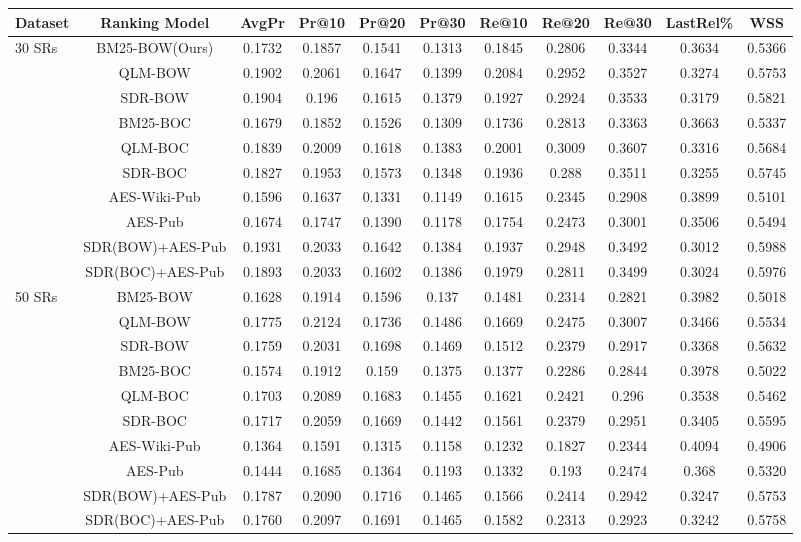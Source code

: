 \begin{tabular}{l|c|c|c|c|c|c|c|c|c|c}
		\toprule
		Dataset&Ranking Model&AvgPr&Pr@10&Pr@20&Pr@30&Re@10&Re@20&Re@30&LastRel\%&WSS\\
		\toprule
		\multirow{8}{*}{30 SRs}&BM25-BOW(Ours)& 0.1732&0.1857&0.1541&0.1313&0.1845&0.2806&0.3344&0.3634&0.5366\\
		
		
		&QLM-BOW&0.1902&0.2061&0.1647&0.1399&0.2084&0.2952&0.3527&0.3274&0.5753\\
		
		&SDR-BOW &0.1904&0.196&0.1615&0.1379&0.1927&0.2924&0.3533&0.3179&0.5821\\
		\cmidrule{2-11}
		
		&BM25-BOC& 0.1679&0.1852&0.1526&0.1309&0.1736&0.2813&0.3363&0.3663&0.5337	\\
		
		
		&QLM-BOC&0.1839&0.2009&0.1618&0.1383&0.2001&0.3009&0.3607&0.3316&0.5684\\
		
		&SDR-BOC &0.1827&0.1953&0.1573&0.1348&0.1936&0.288&0.3511&0.3255&0.5745\\
		\cmidrule{2-11}
		&AES-Wiki-Pub &0.1596&0.1637&0.1331&0.1149&0.1615&0.2345&0.2908&0.3899&0.5101\\\
		&AES-Pub &0.1674&0.1747&0.1390&0.1178&0.1754&0.2473&0.3001&0.3506&0.5494\\
		\cmidrule{2-11}
		&SDR(BOW)+AES-Pub &0.1931&0.2033&0.1642&0.1384&0.1937&0.2948&0.3492&0.3012&0.5988\\\
		&SDR(BOC)+AES-Pub &0.1893&0.2033&0.1602&0.1386&0.1979&0.2811&0.3499&0.3024&0.5976\\
		\midrule
		\multirow{8}{*}{50 SRs}&BM25-BOW& 0.1628&0.1914&0.1596&0.137&0.1481&0.2314&0.2821&0.3982&0.5018\\
		
		
		&QLM-BOW&0.1775&0.2124&0.1736&0.1486&0.1669&0.2475&0.3007&0.3466&0.5534\\
		
		&SDR-BOW &0.1759&0.2031&0.1698&0.1469&0.1512&0.2379&0.2917&0.3368&0.5632\\
		\cmidrule{2-11}
		
		&BM25-BOC& 0.1574&0.1912&0.159&0.1375&0.1377&0.2286&0.2844&0.3978&0.5022\\
		
		
		&QLM-BOC&0.1703&0.2089&0.1683&0.1455&0.1621&0.2421&0.296&0.3538&0.5462\\
		
		&SDR-BOC &0.1717&0.2059&0.1669&0.1442&0.1561&0.2379&0.2951&0.3405&0.5595\\
		\cmidrule{2-11}
		&AES-Wiki-Pub &0.1364&0.1591&0.1315&0.1158&0.1232&0.1827&0.2344&0.4094&0.4906\\\
		&AES-Pub & 0.1444&0.1685&0.1364&0.1193&0.1332&0.193&0.2474&0.368&0.5320\\
		\cmidrule{2-11}
		&SDR(BOW)+AES-Pub &0.1787&0.2090&0.1716&0.1465&0.1566&0.2414&0.2942&0.3247&0.5753\\
		&SDR(BOC)+AES-Pub &0.1760&0.2097&0.1691&0.1465&0.1582&0.2313&0.2923&0.3242&0.5758\\
		
		
		\bottomrule
	\end{tabular}